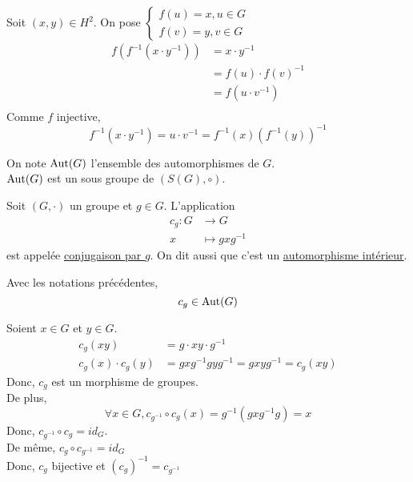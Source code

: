 \begin{prv}
	Soit $(x,y) \in H^2$. On pose $\begin{cases}
		f(u) = x, u \in G\\
		f(v) = y, v \in G
	\end{cases}$\\
	\begin{align*}
		f\left(f^{-1}\left( x \cdot y^{-1} \right) \right) &= x \cdot y^{-1}\\
			&= f(u) \cdot f(v)^{-1}\\
			&= f\left( u \cdot v^{-1} \right)  \\
	\end{align*}
	Comme $f$ injective, \[
	f^{-1}\left( x \cdot y ^{-1} \right) = u \cdot v ^{-1} = f^{-1}(x)\left( f^{-1}(y) \right) ^{-1}
	\] 
\end{prv}

\begin{crlr}
	On note $\operatorname{Aut}(G)$ l'ensemble des automorphismes de $G$.\\
	$\operatorname{Aut}(G)$ est un sous groupe de $\left( S(G), \circ \right)$.
\end{crlr}

\begin{defn}
	Soit $(G, \cdot)$ un groupe et $g \in G$. L'application
	\begin{align*}
		c_g: G &\longrightarrow G \\
		x &\longmapsto g x g^{-1}
	\end{align*}
	est appelée \underline{conjugaison par $g$}. On dit aussi que c'est un \underline{automorphisme intérieur}.
\end{defn}

\begin{prop}
	Avec les notations précédentes, \[
		c_g \in \operatorname{Aut}(G)
	\] 
\end{prop}

\begin{prv}
	Soient $x \in G$ et $y \in G$.
	\begin{align*}
		c_g(xy) &= g \cdot xy \cdot g ^{-1}\\
		c_g(x)\cdot c_g(y) &= gxg^{-1}gyg^{-1} = gxyg^{-1}=c_g(xy)
	\end{align*}
	Donc, $c_g$ est un morphisme de groupes.\\
	
	De plus, \[
	\forall x \in G, c_{g^{-1}} \circ c_g (x) = g^{-1}\left( gxg^{-1}g \right) = x
	\] 
	Donc, $c_{g^{-1}} \circ c_g = id_G$.\\
	De même, $c_g \circ c_{g^{-1}} = id_G$ \\
	Donc, $c_g$ bijective et $\left( c_g \right) ^{-1} = c_{g^{-1}}$
\end{prv}

